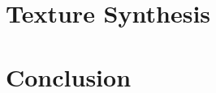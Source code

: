 \documentclass[11pt]{article}
\begin{document}
\section{Texture Synthesis}


\section{Conclusion}

\vspace{3.0cm}



\end{document}

